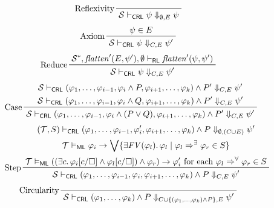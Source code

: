 \documentclass{article}
\newcommand{\RL}{\mathsf{RL}}
\newcommand{\ML}{\mathsf{ML}}
\newcommand{\CRL}{\mathsf{CRL}}
\begin{document}
\begin{figure}
    \centering
    \begin{align*}
    & \prftree[l]{Reflexivity}{\mathcal{S} \vdash_\CRL \psi \Downarrow_{\emptyset,E} \psi}
    \end{align*}
    \begin{align*}
    & \prftree[l]{Axiom}{\psi \in E}{\mathcal{S} \vdash_\CRL \psi \Downarrow_{C,E} \psi^\prime}
    \end{align*}
    \begin{align*}
    & \prftree[l]{Reduce}
      {\mathcal{S}^*, \mathit{flatten}^\prime(E, \psi^\prime), \emptyset \vdash_\RL
        \mathit{flatten}^\prime(\psi, \psi^\prime) }
      {\mathcal{S} \vdash_\CRL \psi \Downarrow_{C,E} \psi^\prime}
    \end{align*}
    \begin{align*}
    & \prftree[l]{Case}
    { \prfStackPremises
      {\mathcal{S} \vdash_\CRL (\varphi_1, \ldots, \varphi_{i-1}, \varphi_i \land P, \varphi_{i+1}, \ldots, \varphi_k) \land P^\prime \Downarrow_{C, E} \psi^\prime }
      {\mathcal{S} \vdash_\CRL (\varphi_1, \ldots, \varphi_{i-1}, \varphi_i \land Q, \varphi_{i+1}, \ldots, \varphi_k) \land P^\prime \Downarrow_{C, E} \psi^\prime }
    }
    {\mathcal{S} \vdash_\CRL (\varphi_1, \ldots, \varphi_{i-1}, \varphi_i \land (P \lor Q), \varphi_{i+1}, \ldots, \varphi_k) \land P^\prime \Downarrow_{C, E} \psi^\prime}
    \end{align*}
    \begin{align*}
    & \prftree[l]{Step}
    { \prfStackPremises
       {  (\mathcal{T}, S) \vdash_\CRL (\varphi_1, \ldots, \varphi_{i-1}, \varphi_i^\prime, \varphi_{i+1}, \ldots,    \varphi_k)
          \land P
          \Downarrow_{\emptyset, (C \cup E)} \psi^\prime
      }
      { \mathcal{T} \vDash_{\ML} \varphi_i \rightarrow \bigvee \{ \exists \mathit{FV}(\varphi_l).\, \varphi_l \mid \varphi_l \Rightarrow^\exists \varphi_r \in S \} }
      { \mathcal{T} \vDash_\ML ((\exists c.\, \varphi_i[c/\square] \land \varphi_l[c/\square]) \land \varphi_r) \rightarrow \varphi_i^\prime  \mbox{ for each } \varphi_l \Rightarrow^\forall \varphi_r \in S }
    }
    {\mathcal{S} \vdash_\CRL (\varphi_1, \ldots, \varphi_{i-1}, \varphi_i, \varphi_{i+1}, \ldots, \varphi_k) \land P \Downarrow_{C, E} \psi^\prime}
    \end{align*}
    \begin{align*}
    & \prftree[l]{Circularity}
      { \mathcal{S} \vdash_\CRL (\varphi_1, \ldots, \varphi_k) \land P \Downarrow_{C \cup \{ (\varphi_1, \ldots, \varphi_k) \land P \} , E} \psi^\prime}

\end{align*}
\end{figure}
\end{document}
